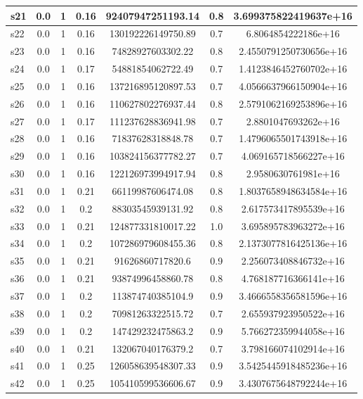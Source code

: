 \documentclass{article}
\begin{document}
\begin{tabular}{|l|c|c|c|c|c|c|}
\hline
s21 &0.0 & 1 & 0.16 & 92407947251193.14 & 0.8 & 3.699375822419637e+16\\
\hline
s22 &0.0 & 1 & 0.16 & 130192226149750.89 & 0.7 & 6.8064854222186e+16\\
\hline
s23 &0.0 & 1 & 0.16 & 74828927603302.22 & 0.8 & 2.4550791250730656e+16\\
\hline
s24 &0.0 & 1 & 0.17 & 54881854062722.49 & 0.7 & 1.4123846452760702e+16\\
\hline
s25 &0.0 & 1 & 0.16 & 137216895120897.53 & 0.7 & 4.0566637966150904e+16\\
\hline
s26 &0.0 & 1 & 0.16 & 110627802276937.44 & 0.8 & 2.5791062169253896e+16\\
\hline
s27 &0.0 & 1 & 0.17 & 111237628836941.98 & 0.7 & 2.8801047693262e+16\\
\hline
s28 &0.0 & 1 & 0.16 & 71837628318848.78 & 0.7 & 1.4796065501743918e+16\\
\hline
s29 &0.0 & 1 & 0.16 & 103824156377782.27 & 0.7 & 4.069165718566227e+16\\
\hline
s30 &0.0 & 1 & 0.16 & 122126973994917.94 & 0.8 & 2.9580630761981e+16\\
\hline
s31 &0.0 & 1 & 0.21 & 66119987606474.08 & 0.8 & 1.8037658948634584e+16\\
\hline
s32 &0.0 & 1 & 0.2 & 88303545939131.92 & 0.8 & 2.617573417895539e+16\\
\hline
s33 &0.0 & 1 & 0.21 & 124877331810017.22 & 1.0 & 3.695895783963272e+16\\
\hline
s34 &0.0 & 1 & 0.2 & 107286979608455.36 & 0.8 & 2.1373077816425136e+16\\
\hline
s35 &0.0 & 1 & 0.21 & 91626860717820.6 & 0.9 & 2.256073408846732e+16\\
\hline
s36 &0.0 & 1 & 0.21 & 93874996458860.78 & 0.8 & 4.768187716366141e+16\\
\hline
s37 &0.0 & 1 & 0.2 & 113874740385104.9 & 0.9 & 3.4666558356581596e+16\\
\hline
s38 &0.0 & 1 & 0.2 & 70981263322515.72 & 0.7 & 2.655937923950522e+16\\
\hline
s39 &0.0 & 1 & 0.2 & 147429232475863.2 & 0.9 & 5.766272359944058e+16\\
\hline
s40 &0.0 & 1 & 0.21 & 132067040176379.2 & 0.7 & 3.798166074102914e+16\\
\hline
s41 &0.0 & 1 & 0.25 & 126058639548307.33 & 0.9 & 3.5425445918485236e+16\\
\hline
s42 &0.0 & 1 & 0.25 & 105410599536606.67 & 0.9 & 3.4307675648792244e+16\\

\end{tabular}
\end{document}
